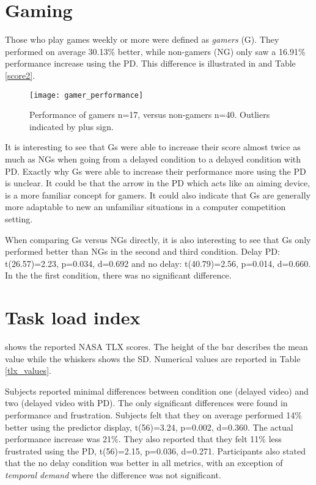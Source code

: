 \section{Gaming}

Those who play games weekly or more were defined as \emph{gamers} (G). They performed on average 30.13\% better, while non-gamers (NG) only saw a 16.91\% performance increase using the PD. This difference is illustrated in  and Table \ref{score2}.

\begin{figure}[h!]
	\vspace{-3mm}
    \centering
    \texttt{[image: gamer\_performance]}
	\vspace{-3mm}
    \caption{Performance of gamers n=17, versus non-gamers n=40. Outliers indicated by plus sign.}
    \label{gamer_performance}
	\vspace{-4mm}
\end{figure}

It is interesting to see that Gs were able to increase their score almost twice as much as NGs when going from a delayed condition to a delayed condition with PD. Exactly why Gs were able to increase their performance more using the PD is unclear. It could be that the arrow in the PD which acts like an aiming device, is a more familiar concept for gamers. It could also indicate that Gs are generally more adaptable to new an unfamiliar situations in a computer competition setting.

When comparing Gs versus NGs directly, it is also interesting to see that Gs only performed better than NGs in the second and third condition. Delay PD: t(26.57)=2.23, p=0.034, d=0.692 and no delay: t(40.79)=2.56, p=0.014, d=0.660. In the the first condition, there was no significant difference.

\section{Task load index}

 shows the reported NASA TLX scores. The height of the bar describes the mean value while the whiskers shows the SD. Numerical values are reported in Table \ref{tlx_values}.

Subjects reported minimal differences between condition one (delayed video) and two (delayed video with PD). The only significant differences were found in performance and frustration. Subjects felt that they on average performed 14\% better using the predictor display, t(56)=3.24, p=0.002, d=0.360. The actual performance increase was 21\%. They also reported that they felt 11\% less frustrated using the PD, t(56)=2.15, p=0.036, d=0.271. Participants also stated that the no delay condition was better in all metrics, with an exception of \emph{temporal demand} where the difference was not significant.

